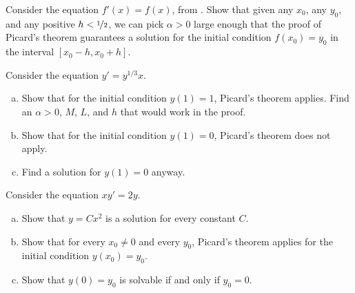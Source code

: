 \begin{exercise}
Consider the equation $f'(x) = f(x)$,
from .  Show that given any $x_0$,
any $y_0$, and any positive $h < \nicefrac{1}{2}$, we can pick $\alpha >
0$ large enough that the proof of Picard's theorem guarantees a solution
for the initial condition $f(x_0) = y_0$ in the interval
$[x_0-h,x_0+h]$.
\end{exercise}

\begin{exercise}
\pagebreak[3]
Consider the equation $y' = y^{1/3}x$.
\begin{enumerate}[a)]
\item
Show that for the initial condition $y(1)=1$, Picard's theorem applies.
Find an $\alpha > 0$, $M$, $L$, and $h$ that would work in the proof.
\item
Show that for the initial condition $y(1) = 0$, Picard's theorem
does not apply.
\item
Find a solution for $y(1) = 0$ anyway.
\end{enumerate}
\end{exercise}

\begin{exercise}
Consider the equation $x y' = 2y$.
\begin{enumerate}[a)]
\item
Show that $y = Cx^2$ is a solution for every constant $C$.
\item
Show that for every $x_0 \not= 0$ and every $y_0$, Picard's
theorem applies for the initial condition $y(x_0) = y_0$.
\item
Show that $y(0) = y_0$ is solvable if and only if $y_0 = 0$.
\end{enumerate}
\end{exercise}
